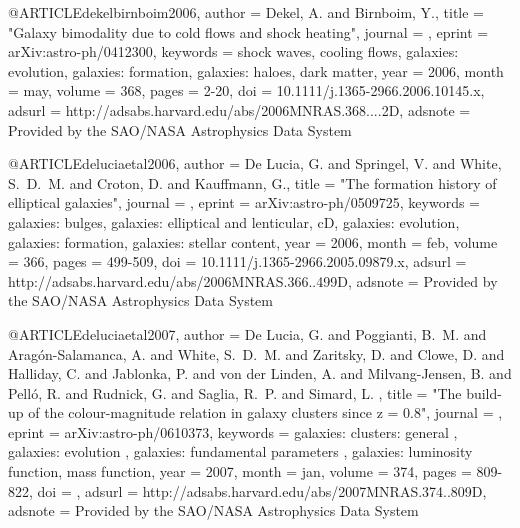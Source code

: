 {{{{{{{{{{{{{{{@ARTICLE{dekelbirnboim2006,
   author = {{Dekel}, A. and {Birnboim}, Y.},
    title = "{Galaxy bimodality due to cold flows and shock heating}",
  journal = {\mnras},
   eprint = {arXiv:astro-ph/0412300},
 keywords = {shock waves, cooling flows, galaxies: evolution, galaxies: formation, galaxies: haloes, dark matter},
     year = 2006,
    month = may,
   volume = 368,
    pages = {2-20},
      doi = {10.1111/j.1365-2966.2006.10145.x},
   adsurl = {http://adsabs.harvard.edu/abs/2006MNRAS.368....2D},
  adsnote = {Provided by the SAO/NASA Astrophysics Data System}
}



@ARTICLE{deluciaetal2006,
   author = {{De Lucia}, G. and {Springel}, V. and {White}, S.~D.~M. and 
	{Croton}, D. and {Kauffmann}, G.},
    title = "{The formation history of elliptical galaxies}",
  journal = {\mnras},
   eprint = {arXiv:astro-ph/0509725},
 keywords = {galaxies: bulges, galaxies: elliptical and lenticular, cD, galaxies: evolution, galaxies: formation, galaxies: stellar content},
     year = 2006,
    month = feb,
   volume = 366,
    pages = {499-509},
      doi = {10.1111/j.1365-2966.2005.09879.x},
   adsurl = {http://adsabs.harvard.edu/abs/2006MNRAS.366..499D},
  adsnote = {Provided by the SAO/NASA Astrophysics Data System}
}

@ARTICLE{deluciaetal2007,
   author = {{De Lucia}, G. and {Poggianti}, B.~M. and {Arag{\'o}n-Salamanca}, A. and 
	{White}, S.~D.~M. and {Zaritsky}, D. and {Clowe}, D. and {Halliday}, C. and 
	{Jablonka}, P. and {von der Linden}, A. and {Milvang-Jensen}, B. and 
	{Pell{\'o}}, R. and {Rudnick}, G. and {Saglia}, R.~P. and {Simard}, L.
	},
    title = "{The build-up of the colour-magnitude relation in galaxy clusters since z = 0.8}",
  journal = {\mnras},
   eprint = {arXiv:astro-ph/0610373},
 keywords = {galaxies: clusters: general , galaxies: evolution , galaxies: fundamental parameters , galaxies: luminosity function, mass function},
     year = 2007,
    month = jan,
   volume = 374,
    pages = {809-822},
      doi = { },
   adsurl = {http://adsabs.harvard.edu/abs/2007MNRAS.374..809D},
  adsnote = {Provided by the SAO/NASA Astrophysics Data System}
}


}}}}}}}}}}}}}}}
